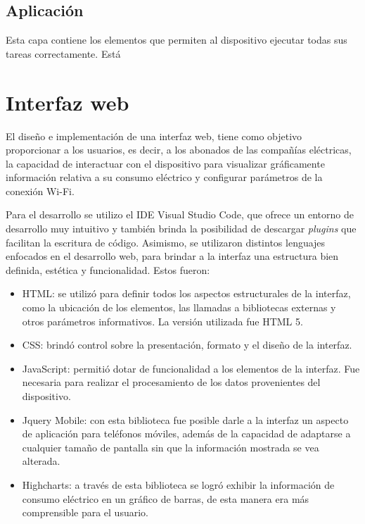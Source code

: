\subsection{Aplicación}

Esta capa contiene los elementos que permiten al dispositivo ejecutar todas sus tareas correctamente. Está 


\section{Interfaz web}

El diseño e implementación de una interfaz web, tiene como objetivo proporcionar a los usuarios, es decir, a los abonados de las compañías eléctricas, la capacidad de interactuar con el dispositivo para visualizar gráficamente información relativa a su consumo eléctrico y configurar parámetros de la conexión Wi-Fi.

Para el desarrollo se utilizo el IDE Visual Studio Code, que ofrece un entorno de desarrollo muy intuitivo y también brinda la posibilidad de descargar \textit{plugins} que facilitan la escritura de código. Asimismo, se utilizaron distintos lenguajes enfocados en el desarrollo web, para brindar a la interfaz una estructura bien definida, estética y funcionalidad. Estos fueron:

\begin{itemize}
	\item HTML: se utilizó para definir todos los aspectos estructurales de la interfaz, como la ubicación de los elementos, las llamadas a bibliotecas externas y otros parámetros informativos. La versión utilizada fue HTML 5.
	\item CSS: brindó control sobre la presentación, formato y el diseño de la interfaz.
	\item JavaScript: permitió dotar de funcionalidad a los elementos de la interfaz. Fue necesaria para realizar el procesamiento de los datos provenientes del dispositivo.
	\item Jquery Mobile: con esta biblioteca fue posible darle a la interfaz un aspecto de aplicación para teléfonos móviles, además de la capacidad de adaptarse a cualquier tamaño de pantalla sin que la información mostrada se vea alterada.
	\item Highcharts: a través de esta biblioteca se logró exhibir la información de consumo eléctrico en un gráfico de barras, de esta manera era más comprensible para el usuario.\end{itemize}

